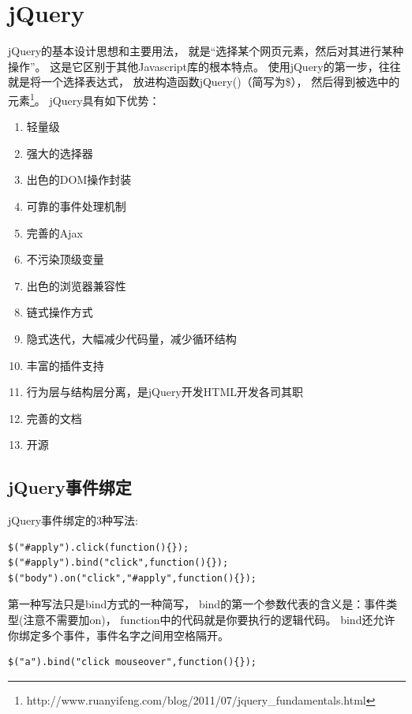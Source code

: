 \documentclass{book}
\begin{document}
\section{jQuery}

jQuery的基本设计思想和主要用法，
就是“选择某个网页元素，然后对其进行某种操作”。
这是它区别于其他Javascript库的根本特点。
使用jQuery的第一步，往往就是将一个选择表达式，
放进构造函数jQuery()（简写为\$），
然后得到被选中的元素\footnote{http://www.ruanyifeng.com/blog/2011/07/jquery\_fundamentals.html}。
jQuery具有如下优势：

\begin{enumerate}
\setcounter{enumi}{0}
\item{轻量级}
\item{强大的选择器}
\item{出色的DOM操作封装}
\item{可靠的事件处理机制}
\item{完善的Ajax}
\item{不污染顶级变量}
\item{出色的浏览器兼容性}
\item{链式操作方式}
\item{隐式迭代，大幅减少代码量，减少循环结构}
\item{丰富的插件支持}
\item{行为层与结构层分离，是jQuery开发HTML开发各司其职}
\item{完善的文档}
\item{开源}
\end{enumerate}

\subsection{jQuery事件绑定}

jQuery事件绑定的3种写法:

\begin{lstlisting}[language=VBScript]
$("#apply").click(function(){});
$("#apply").bind("click",function(){});
$("body").on("click","#apply",function(){});
\end{lstlisting}

第一种写法只是bind方式的一种简写，
bind的第一个参数代表的含义是：事件类型(注意不需要加on)，
function中的代码就是你要执行的逻辑代码。
bind还允许你绑定多个事件，事件名字之间用空格隔开。

\begin{lstlisting}[language=VBScript]
$("a").bind("click mouseover",function(){});
\end{lstlisting}
\end{document}
